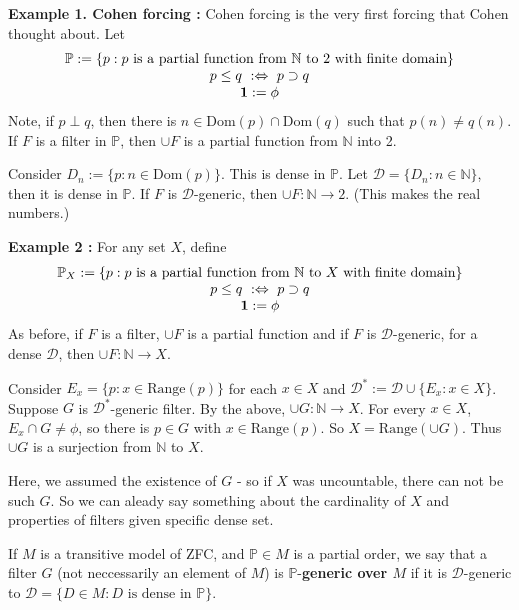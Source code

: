 \documentclass[12pt,a4paper]{article}
\begin{document}
\textbf{Example 1. Cohen forcing :} Cohen forcing is the very first forcing that Cohen thought about. Let
\begin{align*}
\begin{array}{c}
\mathbb{P} := \{p : p \text{ is a partial function from } \mathbb{N} \text{ to } 2 \text{ with finite domain} \} \\
p\leq q \,\, :\Leftrightarrow \,\, p \supset q \\
\bm{1} := \phi
\end{array}
\end{align*}
Note, if $p\perp q$, then there is $n\in \text{Dom}(p) \cap \text{Dom}(q)$ such that $p(n) \neq q(n)$. If $F$ is a filter in $\mathbb{P}$, then $\cup F$ is a partial function from $\mathbb{N}$ into 2. 

\quad Consider $D_n := \{p : n\in \text{Dom}(p)\}$. This is dense in $\mathbb{P}$. Let $\mathscr{D} = \{D_n : n\in \mathbb{N}\}$, then it is dense in $\mathbb{P}$. If $F$ is $\mathscr{D}$-generic, then $\cup F : \mathbb{N} \rightarrow 2$. (This makes the real numbers.)
\s

\textbf{Example 2 :} For any set $X$, define
\begin{align*}
\begin{array}{c}
\mathbb{P}_X := \{p : p \text{ is a partial function from } \mathbb{N} \text{ to } X \text{ with finite domain} \} \\
p\leq q \,\, :\Leftrightarrow \,\,  p \supset q \\
\bm{1} := \phi
\end{array}
\end{align*}
As before, if $F$ is a filter, $\cup F$ is a partial function and if $F$ is $\mathscr{D}$-generic, for a dense $\mathscr{D}$, then $\cup F: \mathbb{N} \rightarrow X$.

\quad Consider $E_x = \{p : x\in \text{Range}(p) \}$ for each $x\in X$ and $\mathscr{D}^* := \mathscr{D} \cup \{E_x : x\in X \}$. Suppose $G$ is $\mathscr{D}^*$-generic filter. By the above, $\cup G : \mathbb{N} \rightarrow X$. For every $x\in X$, $E_x \cap G \neq \phi$, so there is $p\in G$ with $x\in \text{Range}(p)$. So $X = \text{Range}(\cup G)$. Thus $\cup G$ is a surjection from $\mathbb{N}$ to $X$.

\quad Here, we assumed the existence of $G$ - so if $X$ was uncountable, there can not be such $G$. So we can aleady say something about the cardinality of $X$ and properties of filters given specific dense set. 
\s

 If $M$ is a transitive model of ZFC, and $\mathbb{P}\in M$ is a partial order, we say that a filter $G$ (not neccessarily an element of $M$) is $\mathbb{P}$-\textbf{generic over $M$} if it is $\mathscr{D}$-generic to $\mathscr{D} = \{D\in M : D \text{ is dense in } \mathbb{P} \}$.
\s
\end{document}
